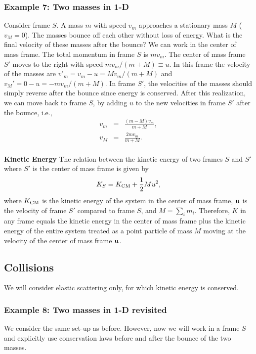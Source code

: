 \documentclass[12pt]{article}
\newcommand{\be}{\begin{eqnarray}}
\newcommand{\ee}{\end{eqnarray}}
\begin{document}
\subsubsection*{Example 7: Two masses in 1-D}
Consider frame $S$. A mass $m$ with speed $v_m$ approaches a stationary mass $M$ ($v_M = 0$). The masses bounce off each other without loss of energy. What is the final velocity of these masses after the bounce? We can work in the center of mass frame. The total momentum in frame $S$ is $mv_m$. The center of mass frame $S'$ moves to the right with speed $mv_m/(m+M) \equiv u$. In this frame the velocity of the masses are $v'_m = v_m - u = Mv_m/(m+M)$ and $v_M' = 0 - u  = - mv_m/(m+M)$. In frame $S'$, the velocities of the masses should simply reverse after the bounce since energy is conserved. After this realization, we can move back to frame $S$, by adding $u$ to the new velocities in frame $S'$ after the bounce, i.e.,
\be
v_m &=& \frac{(m-M)v_m}{m+M}, \\
v_M &=& \frac{2m v_m}{m+M}.
\ee
\\

\noindent
{\bf Kinetic Energy} The relation between the kinetic energy of two frames $S$ and $S'$ where $S'$ is the center of mass frame is given by 
\be
K_S = K_{\rm CM} + \frac{1}{2} Mu^2,
\ee
where $K_{\rm CM}$ is the kinetic energy of the system in the center of mass frame, $\bf u$ is the velocity of frame $S'$ compared to frame $S$, and $M = \sum_im_i$. Therefore, $K$ in any frame equals the kinetic energy in the center of mass frame plus the kinetic energy of the entire system treated as a point particle of mass $M$ moving at the velocity of the center of mass frame $\bf u$. 

\subsection{Collisions}
We will consider elastic scattering only, for which kinetic energy is conserved. 

\subsubsection*{Example 8: Two masses in 1-D revisited}
We consider the same set-up as before. However, now we will work in a frame $S$ and explicitly use conservation laws before and after the bounce of the two masses. 
\end{document}
